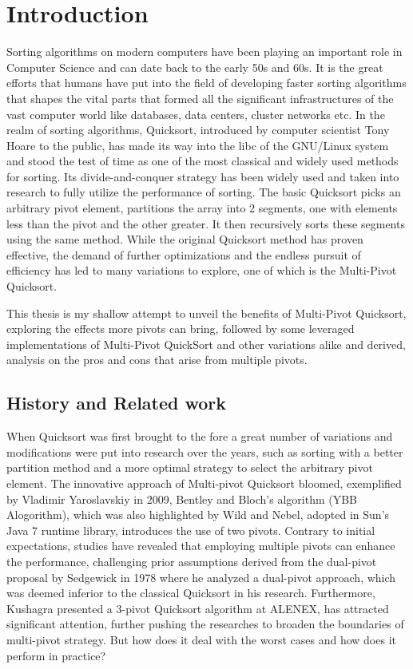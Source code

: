 \documentclass{article}
\begin{document}
\section{Introduction}
Sorting algorithms on modern computers have been playing an important role in Computer Science and can date back to the early 50s and 60s. 
It is the great efforts that humans have put into the field of developing faster sorting algorithms that shapes the vital parts that formed
all the significant infrastructures of the vast computer world like databases, data centers, cluster networks etc.
In the realm of sorting algorithms, Quicksort, introduced by computer scientist Tony Hoare \cite{HoareQuickSort} to the public,
has made its way into the libc of the GNU/Linux system and stood the test of time as one of the most classical and widely used methods for sorting. 
Its divide-and-conquer strategy has been widely used and taken into research to fully utilize the performance of sorting.
The basic Quicksort picks an arbitrary pivot element,
partitions the array into 2 segments, one with elements less than the pivot and the other greater. 
It then recursively sorts these segments using the same method. While the original Quicksort method has proven effective,
the demand of further optimizations and the endless pursuit of efficiency has led to many variations to explore, one of which is the Multi-Pivot Quicksort. 

This thesis is my shallow attempt to unveil the benefits of Multi-Pivot Quicksort, exploring the effects more pivots can bring,
followed by some leveraged implementations of Multi-Pivot QuickSort and other variations alike and derived, analysis on the pros and cons that arise from multiple pivots.

\subsection{History and Related work}

When Quicksort was first brought to the fore a great number of variations and modifications were put into research over the years,
such as sorting with a better partition method and a more optimal strategy to select the arbitrary pivot element.
The innovative approach of Multi-pivot Quicksort bloomed, exemplified by Vladimir Yaroslavskiy \cite{Yaroslavskiy} in 2009,
Bentley and Bloch's algorithm (YBB Alogorithm), which was also highlighted by Wild and Nebel, adopted in Sun's Java 7 runtime library, 
introduces the use of two pivots. Contrary to initial expectations, studies have revealed that employing multiple pivots can enhance the performance,
challenging prior assumptions derived from the dual-pivot proposal by Sedgewick \cite{Sedgewick} in 1978 where he analyzed a dual-pivot approach, 
which was deemed inferior to the classical Quicksort in his research. Furthermore, Kushagra presented a 3-pivot Quicksort \cite{Kushagra} algorithm at ALENEX,
has attracted significant attention, further pushing the researches to broaden the boundaries of multi-pivot strategy. But how does it deal with the worst cases and how does it perform in practice? 
\end{document}

